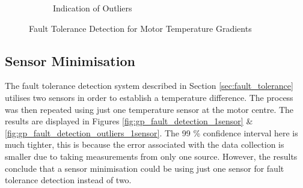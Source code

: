 \documentclass[a4paper, 10pt]{article}
\numberwithin{equation}{section}
\begin{document}
\begin{figure}[H]
\begin{subfigure}[b]{0.49\textwidth}
        \caption{Indication of Outliers}
        \label{fig:gp_fault_detection_outliers}
    \end{subfigure}
    \vspace{-10pt}
    \caption{Fault Tolerance Detection for Motor Temperature Gradients}
\vspace{-0.4cm}
\end{figure}

\subsection{Sensor Minimisation}
\label{sec:Sensor_Minimisation}
The fault tolerance detection system described in Section \ref{sec:fault_tolerance} utilises two sensors in order to establish a temperature difference. The process was then repeated using just one temperature sensor at the motor centre. The results are displayed in Figures \ref{fig:gp_fault_detection_1sensor} \& \ref{fig:gp_fault_detection_outliers_1sensor}. The 99 \% confidence interval here is much tighter, this is because the error associated with the data collection is smaller due to taking measurements from only one source. However, the results conclude that a sensor minimisation could be using just one sensor for fault tolerance detection instead of two.       
\end{document}
